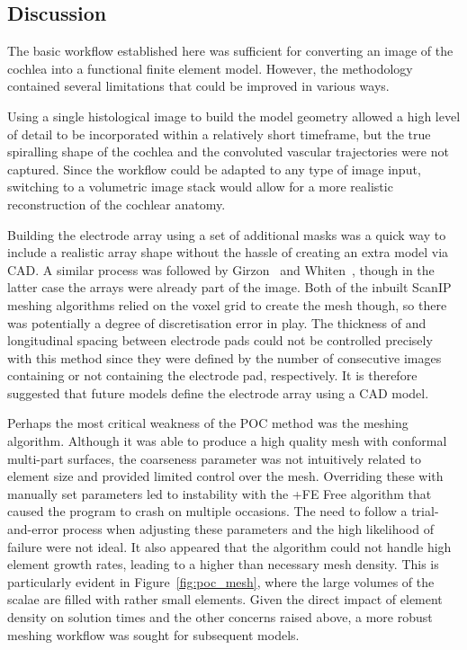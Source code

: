 \subsection{Discussion}

The basic workflow established here was sufficient for converting an image of
the cochlea into a functional finite element model. However, the methodology
contained several limitations that could be improved in various ways.

Using a single histological image to build the model geometry allowed a high
level of detail to be incorporated within a relatively short timeframe, but the
true spiralling shape of the cochlea and the convoluted vascular trajectories
were not captured. Since the workflow could be adapted to any type of image
input, switching to a volumetric image stack would allow for a more realistic
reconstruction of the cochlear anatomy.

Building the electrode array using a set of additional masks was a quick way to
include a realistic array shape without the hassle of creating an extra model
via CAD. A similar process was followed by Girzon~\cite{girzon1987} and
Whiten~\cite{whiten2007}, though in the latter case the arrays were already part
of the image. Both of the inbuilt ScanIP meshing algorithms relied on the voxel
grid to create the mesh though, so there was potentially a degree of
discretisation error in play. The thickness of and longitudinal spacing between
electrode pads could not be controlled precisely with this method since they
were defined by the number of consecutive images containing or not containing
the electrode pad, respectively. It is therefore suggested that future models
define the electrode array using a CAD model.

Perhaps the most critical weakness of the POC method was the meshing algorithm.
Although it was able to produce a high quality mesh with conformal multi-part
surfaces, the coarseness parameter was not intuitively related to element size
and provided limited control over the mesh. Overriding these with manually set
parameters led to instability with the +FE Free algorithm that caused the
program to crash on multiple occasions. The need to follow a trial-and-error
process when adjusting these parameters and the high likelihood of failure were
not ideal. It also appeared that the algorithm could not handle high element
growth rates, leading to a higher than necessary mesh density. This is
particularly evident in Figure~\ref{fig:poc_mesh}, where the large volumes of
the scalae are filled with rather small elements. Given the direct impact of
element density on solution times and the other concerns raised above, a more
robust meshing workflow was sought for subsequent models.

